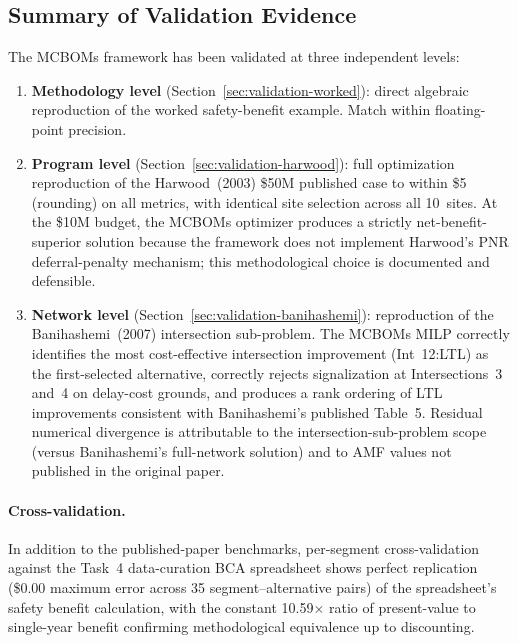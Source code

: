 \subsection{Summary of Validation Evidence}

The MCBOMs framework has been validated at three independent levels:

\begin{enumerate}[leftmargin=2em, itemsep=4pt]
  \item \textbf{Methodology level} (Section~\ref{sec:validation-worked}):
    direct algebraic reproduction of the worked safety-benefit example.
    Match within floating-point precision.
  \item \textbf{Program level} (Section~\ref{sec:validation-harwood}): full
    optimization reproduction of the Harwood~(2003) \$50M published case to
    within \$5 (rounding) on all metrics, with identical site selection
    across all 10~sites. At the \$10M budget, the MCBOMs optimizer produces
    a strictly net-benefit-superior solution because the framework does not
    implement Harwood's PNR deferral-penalty mechanism; this methodological
    choice is documented and defensible.
  \item \textbf{Network level} (Section~\ref{sec:validation-banihashemi}):
    reproduction of the Banihashemi~(2007) intersection sub-problem. The
    MCBOMs MILP correctly identifies the most cost-effective intersection
    improvement (Int~12:LTL) as the first-selected alternative, correctly
    rejects signalization at Intersections~3 and~4 on delay-cost grounds,
    and produces a rank ordering of LTL improvements consistent with
    Banihashemi's published Table~5. Residual numerical divergence is
    attributable to the intersection-sub-problem scope (versus Banihashemi's
    full-network solution) and to AMF values not published in the original
    paper.
\end{enumerate}

\paragraph{Cross-validation.} In addition to the published-paper benchmarks,
per-segment cross-validation against the Task~4 data-curation BCA
spreadsheet shows perfect replication (\$0.00 maximum error across 35
segment--alternative pairs) of the spreadsheet's safety benefit calculation,
with the constant 10.59$\times$ ratio of present-value to single-year
benefit confirming methodological equivalence up to discounting.


